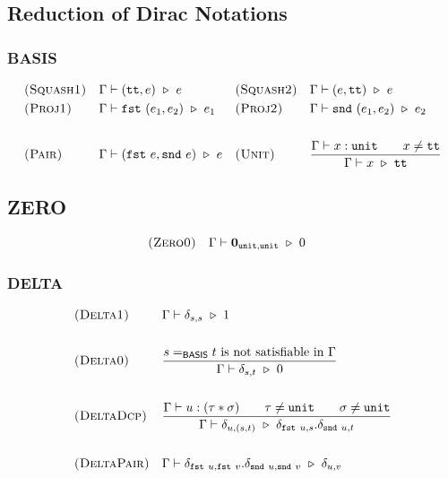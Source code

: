 


\subsection{Reduction of Dirac Notations}

\subsubsection*{\textsf{BASIS}}
\begin{align*}
    & \textsc{(Squash1)} && \Gamma \vdash (\utt, e) \reduce e 
    && \textsc{(Squash2)} && \Gamma \vdash (e, \utt) \reduce e \\
    & \textsc{(Proj1)} && \Gamma \vdash \fst\ (e_1, e_2) \reduce e_1
    && \textsc{(Proj2)} && \Gamma \vdash \snd\ (e_1, e_2) \reduce e_2  \\
    \\
    & \textsc{(Pair)} && \Gamma \vdash (\fst\ e, \snd\ e)\reduce e
    && \textsc{(Unit)} && \frac{\Gamma \vdash x : \unit \qquad x \neq \utt}{\Gamma \vdash x\reduce\utt} 
\end{align*}

\subsection*{\textsf{ZERO}}
\begin{align*}
    & \textsc{(Zero0)} && \Gamma \vdash \mathbf{0}_{\texttt{unit}, \texttt{unit}} \ \triangleright\  0
\end{align*}

\subsubsection*{\textsf{DELTA}}
\begin{align*}
  & \textsc{(Delta1)} && 
  \Gamma \vdash \delta_{s, s} \reduce 1
  \\
  \\
  & \textsc{(Delta0)} && 
  \frac{s =_\textsf{BASIS} t\ \textrm{is not satisfiable in}\ \Gamma}{\Gamma \vdash \delta_{s, t} \reduce 0} \\
  \\
  & \textsc{(DeltaDcp)} && 
  \frac{\Gamma \vdash u : ( \tau * \sigma ) \qquad \tau \neq \unit \qquad \sigma \neq \unit}{\Gamma \vdash \delta_{u, (s, t)} \reduce \delta_{\fst\ u, s}.\delta_{\snd\ u, t}} 
  \\
  \\
  & \textsc{(DeltaPair)} &&
  \Gamma \vdash \delta_{\fst\ u, \fst\ v}.\delta_{\snd\ u, \snd\ v} \reduce \delta_{u, v}
\end{align*}

